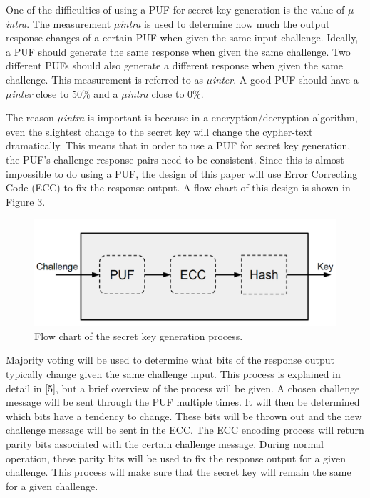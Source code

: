 \documentclass[letterpaper, 10 pt, conference]{ieeeconf}  %
\begin{document}
One of the difficulties of using a PUF for secret key generation is the value of \emph{$\mu$intra}.  The measurement \emph{$\mu$intra} is used to determine how much the output response changes of a certain PUF when given the same input challenge.  Ideally, a PUF should generate the same response when given the same challenge.  Two different PUFs should also generate a different response when given the same challenge.  This measurement is referred to as \emph{$\mu$inter}.  A good PUF should have a \emph{$\mu$inter} close to $50\%$ and a \emph{$\mu$intra} close to $0\%$.

The reason \emph{$\mu$intra} is important is because in a encryption/decryption algorithm, even the slightest change to the secret key will change the cypher-text dramatically.  This means that in order to use a PUF for secret key generation, the PUF's challenge-response pairs need to be consistent.  Since this is almost impossible to do using a PUF, the design of this paper will use Error Correcting Code (ECC) to fix the response output.  A flow chart of this design is shown in Figure 3.

\begin{figure}[thpb]
	\centering
	\includegraphics[scale=.25]{keyGen}
   \caption{Flow chart of the secret key generation process.}
\end{figure}

Majority voting will be used to determine what bits of the response output typically change given the same challenge input.  This process is explained in detail in [5], but a brief overview of the process will be given.  A chosen challenge message will be sent through the PUF multiple times.  It will then be determined which bits have a tendency to change.  These bits will be thrown out and the new challenge message will be sent in the ECC.  The ECC encoding process will return parity bits associated with the certain challenge message.  During normal operation, these parity bits will be used to fix the response output for a given challenge.  This process will make sure that the secret key will remain the same for a given challenge.
\end{document}
